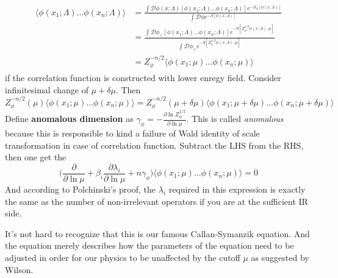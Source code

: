 \documentclass[12pt,halfline,a4paper]{ouparticle}
\begin{document}
\begin{align}
	\begin{split}
		\langle\phi(x_1;\Lambda)...\phi(x_n;\Lambda)\rangle&=\frac{\int \mathcal D\phi(x;\Lambda)[\phi(x_1;\Lambda)...\phi(x_n;\Lambda)]e^{-S_\Lambda[\phi(x;\Lambda)]}}{\int \mathcal D\phi e^{-S[\phi(x;\Lambda)]}}\\
		&=\frac{\int \mathcal D\phi_<[\phi(x_1;\Lambda)...\phi(x_n;\Lambda)]e^{-S[Z^{1/2}_\phi\phi(x;\Lambda),\mu]}}{\int \mathcal D\phi_< e^{-S[Z^{1/2}_\phi\phi(x;\Lambda),\mu]}}\\
		&=Z^{-n/2}_\phi\langle\phi(x_1;\mu)...\phi(x_n;\mu)\rangle
	\end{split}
\end{align}
if the correlation function is constructed with lower enregy field. Consider infinitesimal change of $\mu+\delta\mu$. Then
\begin{equation}
	Z^{-n/2}_\phi(\mu)\langle\phi(x_1;\mu)...\phi(x_n;\mu)\rangle=Z^{-n/2}_\phi(\mu+\delta \mu)\langle\phi(x_1;\mu+\delta \mu)...\phi(x_n;\mu+\delta \mu)\rangle
\end{equation}
Define \textbf{anomalous dimension} as $\gamma_\phi=-\frac{\partial\ln Z_\phi^{1/2}}{\partial\ln \mu}$. 
This is called \textit{anomalous} because this is responsible to kind a failure of Wald identity of scale transformation in case of correlation function.
Subtract the LHS from the RHS, then one get the
\begin{equation}
	\bigg(\frac{\partial}{\partial \ln\mu} + \beta_i\frac{\partial \lambda_i}{\partial \ln\mu}  + n\gamma_\phi\bigg)\langle\phi(x_1;\mu)...\phi(x_n;\mu)\rangle=0
\end{equation}
And according to Polchinski's proof, the $\lambda_i$ required in this expression is exactly the same as the number of non-irrelevant operators if you are at the sufficient IR side. 

It's not hard to recognize that this is our famous Callan-Symanzik equation.
And the equation merely describes how the parameters of the equation need to be adjusted in order for our physics to be unaffected by the cutoff $\mu$ as suggested by Wilson. 
\end{document}
